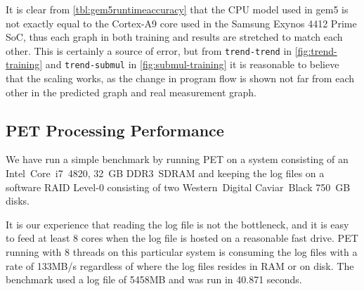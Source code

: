 It is clear from \autoref{tbl:gem5runtimeaccuracy} that the CPU model used
in gem5 is not exactly equal to the Cortex-A9 core used in the Samsung Exynos
4412 Prime SoC, thus each graph in both training and results are stretched to
match each other. This is certainly a source of error, but from
\texttt{trend-trend} in \autoref{fig:trend-training} and \texttt{trend-submul}
in \autoref{fig:submul-training} it is reasonable to believe that the scaling
works, as the change in program flow is shown not far from each other in the
predicted graph and real measurement graph.


\subsection{PET Processing Performance}

We have run a simple benchmark by running PET on a system consisting of an
Intel~Core~i7~4820, 32~GB DDR3~SDRAM and keeping the log files on a software RAID
Level-0 consisting of two Western~Digital Caviar~Black 750~GB disks.

It is our experience that reading the log file is not the bottleneck, and it is
easy to feed at least 8 cores when the log file is hosted on a reasonable fast
drive.
PET running with 8 threads on this particular system is consuming the log files
with a rate of 133MB/s regardless of where the log files resides in RAM or on
disk. The benchmark used a log file of 5458MB and was run in 40.871 seconds.

